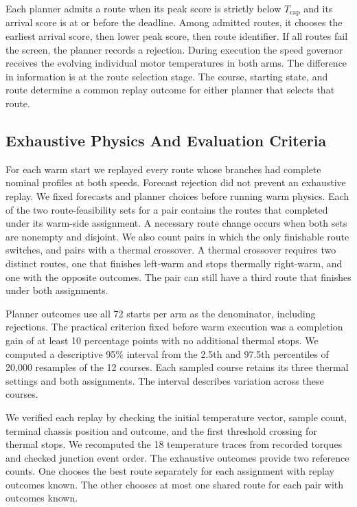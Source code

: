 \documentclass{ieeeaccess}
\begin{document}
Each planner admits a route when its peak score is strictly below $T_{\mathrm{cap}}$ and its arrival score is at or before the deadline. Among admitted routes, it chooses the earliest arrival score, then lower peak score, then route identifier. If all routes fail the screen, the planner records a rejection. During execution the speed governor receives the evolving individual motor temperatures in both arms. The difference in information is at the route selection stage. The course, starting state, and route determine a common replay outcome for either planner that selects that route.

\subsection{Exhaustive Physics And Evaluation Criteria}

For each warm start we replayed every route whose branches had complete nominal profiles at both speeds. Forecast rejection did not prevent an exhaustive replay. We fixed forecasts and planner choices before running warm physics. Each of the two route-feasibility sets for a pair contains the routes that completed under its warm-side assignment. A necessary route change occurs when both sets are nonempty and disjoint. We also count pairs in which the only finishable route switches, and pairs with a thermal crossover. A thermal crossover requires two distinct routes, one that finishes left-warm and stops thermally right-warm, and one with the opposite outcomes. The pair can still have a third route that finishes under both assignments.

Planner outcomes use all 72 starts per arm as the denominator, including rejections. The practical criterion fixed before warm execution was a completion gain of at least 10 percentage points with no additional thermal stops. We computed a descriptive 95\% interval from the 2.5th and 97.5th percentiles of 20,000 resamples of the 12 courses. Each sampled course retains its three thermal settings and both assignments. The interval describes variation across these courses.

We verified each replay by checking the initial temperature vector, sample count, terminal chassis position and outcome, and the first threshold crossing for thermal stops. We recomputed the 18 temperature traces from recorded torques and checked junction event order. The exhaustive outcomes provide two reference counts. One chooses the best route separately for each assignment with replay outcomes known. The other chooses at most one shared route for each pair with outcomes known.
\end{document}
